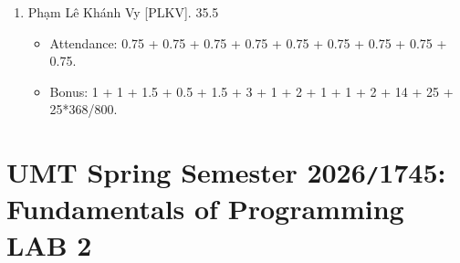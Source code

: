 \documentclass{article}
\begin{document}
\begin{enumerate}
\begin{itemize}
        \item Bonus: 1 + 1 + 2 + 1 + 1.5 + 3 + 1 + 2 + 2 + 2 - 0.5 + 2 + 3 - 0.5 + 1 + 1 + 2 - 0.5 + 7.74 + 12 + 4 + 25 + 25*489/800.
    \end{itemize}
    \item {\sc Phạm Lê Khánh Vy [PLKV].} 35.5
    \begin{itemize}
        \item Attendance: 0.75 + 0.75 + 0.75 + 0.75 + 0.75 + 0.75 + 0.75 + 0.75 + 0.75.
        \item Bonus: 1 + 1 + 1.5 + 0.5 + 1.5 + 3 + 1 + 2 + 1 + 1 + 2 + 14 + 25 + 25*368/800.
    \end{itemize}
\end{enumerate}


\section{UMT Spring Semester 2026{\tt/}1745: Fundamentals of Programming LAB 2}
\end{document}
